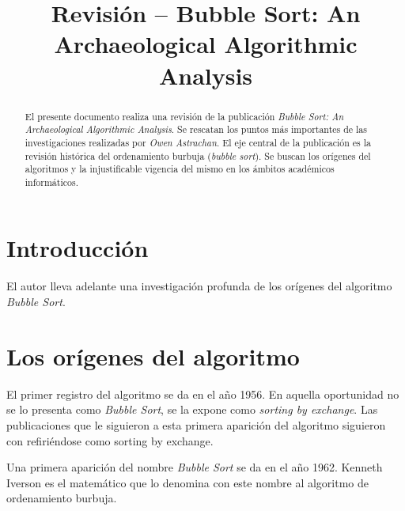 \documentclass[conference]{IEEEtran}
\begin{document}
%
\title{Revisión -- Bubble Sort: An Archaeological Algorithmic Analysis}


\author{
}

\maketitle


\begin{abstract}
El presente documento realiza una revisión de la publicación
\emph{Bubble Sort: An Archaeological Algorithmic Analysis}. Se
rescatan los puntos más importantes de las investigaciones realizadas
por \emph{Owen Astrachan}. El eje central de la publicación es la
revisión histórica del ordenamiento burbuja (\emph{bubble
  sort}). Se buscan los orígenes del algoritmos y la injustificable
vigencia del mismo en los ámbitos académicos informáticos.
\end{abstract}

\IEEEpeerreviewmaketitle

\section{Introducción}
\label{sec:intro}

El autor lleva adelante una investigación profunda de los orígenes del
algoritmo \emph{Bubble Sort}. 

\section{Los orígenes del algoritmo}
\label{sec:origen-alg}

El primer registro del algoritmo se da en el año 1956. En aquella
oportunidad no se lo presenta como \emph{Bubble Sort}, se la expone
como \emph{sorting by exchange}. Las publicaciones que le siguieron a
esta primera aparición del algoritmo siguieron con refiriéndose como
sorting by exchange. 

Una primera aparición del nombre \emph{Bubble Sort} se da en el año
1962.  Kenneth Iverson es el matemático que lo denomina con este
nombre al algoritmo de ordenamiento burbuja.
\end{document}
